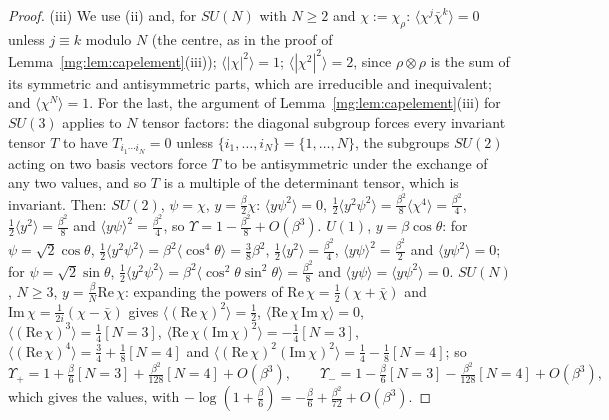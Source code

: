 \documentclass[11pt,a4paper]{article}
\theoremstyle{definition}
\theoremstyle{remark}
\begin{document}
\begin{proof}
(iii) We use (ii) and, for $SU(N)$ with $N\ge2$ and $\chi:=\chi_\rho$: $\langle\chi^j\bar\chi^k\rangle=0$ unless $j\equiv k$ modulo $N$ (the centre, as in the
proof of Lemma~\ref{mg:lem:capelement}(iii)); $\langle|\chi|^2\rangle=1$; $\langle|\chi^2|^2\rangle=2$, since $\rho\otimes\rho$ is the sum of its symmetric and
antisymmetric parts, which are irreducible and inequivalent; and $\langle\chi^N\rangle=1$. For the last, the argument of
Lemma~\ref{mg:lem:capelement}(iii) for $SU(3)$ applies to $N$ tensor factors: the diagonal subgroup forces every invariant tensor $T$ to have
$T_{i_1\cdots i_N}=0$ unless $\{i_1,\dots,i_N\}=\{1,\dots,N\}$, the subgroups $SU(2)$ acting on two basis vectors force $T$ to be antisymmetric under
the exchange of any two values, and so $T$ is a multiple of the determinant tensor, which is invariant. Then:
$SU(2)$, $\psi=\chi$, $y=\frac\beta2\chi$: $\langle y\psi^2\rangle=0$, $\frac12\langle y^2\psi^2\rangle=\frac{\beta^2}8\langle\chi^4\rangle=\frac{\beta^2}4$,
$\frac12\langle y^2\rangle=\frac{\beta^2}8$ and $\langle y\psi\rangle^2=\frac{\beta^2}4$, so $\Upsilon=1-\frac{\beta^2}8+O(\beta^3)$.
$U(1)$, $y=\beta\cos\theta$: for $\psi=\sqrt2\cos\theta$, $\frac12\langle y^2\psi^2\rangle=\beta^2\langle\cos^4\theta\rangle=\frac38\beta^2$, $\frac12\langle y^2\rangle=\frac{\beta^2}4$,
$\langle y\psi\rangle^2=\frac{\beta^2}2$ and $\langle y\psi^2\rangle=0$; for $\psi=\sqrt2\sin\theta$, $\frac12\langle y^2\psi^2\rangle=\beta^2\langle\cos^2\theta\sin^2\theta\rangle=\frac{\beta^2}8$
and $\langle y\psi\rangle=\langle y\psi^2\rangle=0$. $SU(N)$, $N\ge3$, $y=\frac\beta N\mathrm{Re}\,\chi$: expanding the powers of $\mathrm{Re}\,\chi=\frac12(\chi+\bar\chi)$ and
$\mathrm{Im}\,\chi=\frac1{2i}(\chi-\bar\chi)$ gives $\langle(\mathrm{Re}\,\chi)^2\rangle=\frac12$, $\langle\mathrm{Re}\,\chi\,\mathrm{Im}\,\chi\rangle=0$,
$\langle(\mathrm{Re}\,\chi)^3\rangle=\frac14[N=3]$, $\langle\mathrm{Re}\,\chi(\mathrm{Im}\,\chi)^2\rangle=-\frac14[N=3]$, $\langle(\mathrm{Re}\,\chi)^4\rangle=\frac34+\frac18[N=4]$ and
$\langle(\mathrm{Re}\,\chi)^2(\mathrm{Im}\,\chi)^2\rangle=\frac14-\frac18[N=4]$; so
\[
\Upsilon_+=1+\tfrac{\beta}{6}[N=3]+\tfrac{\beta^2}{128}[N=4]+O(\beta^3),\qquad\Upsilon_-=1-\tfrac\beta6[N=3]-\tfrac{\beta^2}{128}[N=4]+O(\beta^3),
\]
which gives the values, with $-\log(1+\frac\beta6)=-\frac\beta6+\frac{\beta^2}{72}+O(\beta^3)$.
\end{proof}
\end{document}
